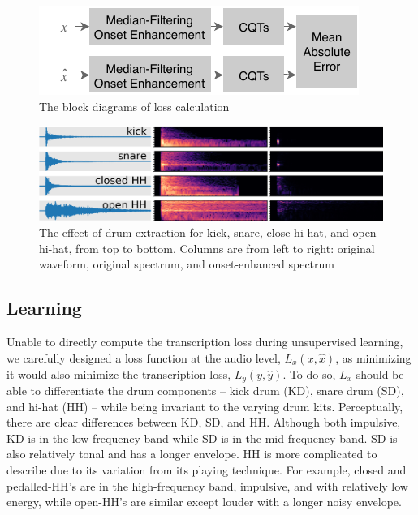 \documentclass{article}
\newcommand{\largesqueeze}{\vspace{-0.2cm}}
\begin{document}
	
	\begin{figure}[t]
		\centering
		\includegraphics[width=\columnwidth]{ismir-2019-loss-blocks.pdf}
		\caption{The block diagrams of loss calculation}
		\label{fig:onset_loss}
	\end{figure}
	
	\begin{figure}[t]
		\centering
		\includegraphics[width=\columnwidth]{fig_before_after_onset.png}
		\caption{The effect of drum extraction for kick, snare, close hi-hat, and open hi-hat, from top to bottom. Columns are from left to right: original waveform, original spectrum, and onset-enhanced spectrum}
		\label{fig:onset_fx}
	\end{figure}
	
	\largesqueeze
	\subsection{Learning}
	
	Unable to directly compute the transcription loss during unsupervised learning, we carefully designed a loss function at the audio level, $L_x(x, \hat{x})$, as minimizing it would also minimize the transcription loss, $L_y(y, \hat{y})$. 
	To do so, $L_x$ should be able to differentiate the drum components -- kick drum (KD), snare drum (SD), and hi-hat (HH) -- while being invariant to the varying drum kits.
	Perceptually, there are clear differences between KD, SD, and HH. Although both impulsive, KD is in the low-frequency band while SD is in the mid-frequency band. SD is also relatively tonal and has a longer envelope. HH is more complicated to describe due to its variation from its playing technique. For example, closed and pedalled-HH's are in the high-frequency band, impulsive, and with relatively low energy, while open-HH's are similar except louder with a longer noisy envelope.
	
\end{document}
